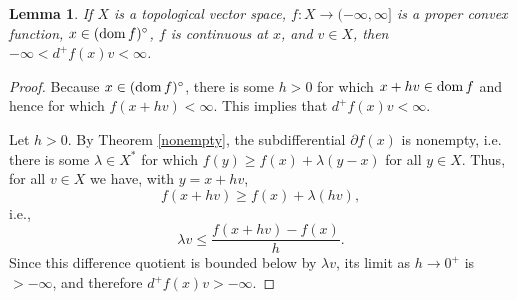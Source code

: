 \documentclass{article}
\newcommand{\dom}{\ensuremath\mathrm{dom}\,}
\newtheorem{lemma}[theorem]{Lemma}
\theoremstyle{definition}
\begin{document}
\begin{lemma}
If $X$ is a topological vector space,  $f:X \to (-\infty,\infty]$ is a proper convex function, $x \in (\dom f)^\circ$, $f$ is continuous at $x$, 
and $v \in X$, then
$-\infty<d^+f(x)v<\infty$.
\end{lemma}
\begin{proof}
Because $x \in (\dom f)^\circ$, there is some $h>0$ for which $x+hv \in \dom f$ and hence for which $f(x+hv)<\infty$.
This implies that $d^+f(x)v < \infty$.

Let $h>0$. By Theorem \ref{nonempty}, the subdifferential $\partial f(x)$ is nonempty, i.e.
there is some $\lambda \in X^*$ for which $f(y) \geq f(x) + \lambda(y-x)$ for all $y \in X$. Thus, for all $v \in X$ we have, with $y=x+hv$, 
\[
f(x+hv) \geq f(x)+\lambda (hv),
\]
i.e.,
\[
\lambda v \leq \frac{f(x+hv)-f(x)}{h}.
\]
Since this difference quotient is bounded below by $\lambda v$, its limit as $h \to 0^+$ is $>-\infty$, and therefore
$d^+f(x)v>-\infty$.
\end{proof}
\end{document}
